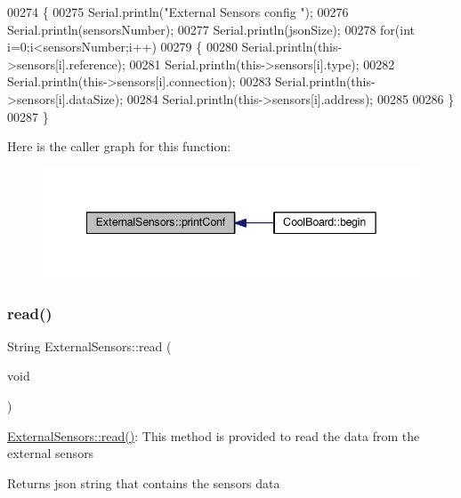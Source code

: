 \begin{DoxyCode}
00274 \{
00275     Serial.println(\textcolor{stringliteral}{"External Sensors config "});
00276     Serial.println(sensorsNumber);
00277     Serial.println(jsonSize);
00278     \textcolor{keywordflow}{for}(\textcolor{keywordtype}{int} i=0;i<sensorsNumber;i++)
00279     \{
00280         Serial.println(this->sensors[i].reference);
00281         Serial.println(this->sensors[i].type);
00282         Serial.println(this->sensors[i].connection);
00283         Serial.println(this->sensors[i].dataSize);
00284         Serial.println(this->sensors[i].address);
00285     
00286     \}
00287 \}
\end{DoxyCode}
Here is the caller graph for this function\+:\nopagebreak
\begin{figure}[H]
\begin{center}
\leavevmode
\includegraphics[width=342pt]{class_external_sensors_a78c2bf55084435dd51d3c559b2d3c6f3_icgraph}
\end{center}
\end{figure}
\mbox{\label{class_external_sensors_a53177b81eca3be89508b5511ddcd00fc}} 
\subsubsection{\texorpdfstring{read()}{read()}}
{\footnotesize\ttfamily String External\+Sensors\+::read (\begin{DoxyParamCaption}\item[{void}]{ }\end{DoxyParamCaption})}

\hyperlink{class_external_sensors_a53177b81eca3be89508b5511ddcd00fc}{External\+Sensors\+::read()}\+: This method is provided to read the data from the external sensors

\begin{DoxyReturn}{Returns}
json string that contains the sensors data 
\end{DoxyReturn}


